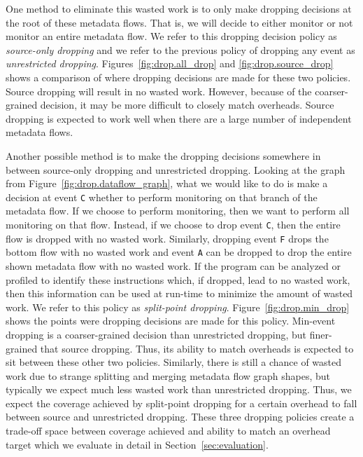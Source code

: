 One method to eliminate this wasted work is to only make dropping decisions at
the root of these metadata flows. That is, we will decide to either monitor or
not monitor an entire metadata flow. We refer to this dropping decision policy
as \emph{source-only dropping} and we refer to the previous policy of 
dropping any event as \emph{unrestricted dropping}.
Figures~\ref{fig:drop.all_drop} and \ref{fig:drop.source_drop} shows a
comparison of where dropping decisions are made for these two policies. Source
dropping will
result in no wasted work. However, because of the coarser-grained decision, it
may be more difficult to closely match overheads. Source dropping is expected
to work well when there are a large number of independent metadata flows.

Another possible method is to make the dropping decisions somewhere in between
source-only dropping and unrestricted dropping. Looking at the graph from 
Figure~\ref{fig:drop.dataflow_graph}, what we would like to do is make a
decision at event {\tt C} whether to perform monitoring on that branch of the
metadata flow. If we choose to perform monitoring, then we want to perform all
monitoring on that flow. Instead, if we choose to drop event {\tt C}, then the
entire flow is dropped with no wasted work. Similarly, dropping event {\tt F}
drops the bottom flow with no wasted work and event {\tt A} can be dropped to
drop the entire shown metadata flow with no wasted work. If the program can be
analyzed or profiled to identify these instructions which, if dropped, lead to
no wasted work, then this information can be used at run-time to minimize the
amount of wasted work. We refer to this policy as \emph{split-point dropping}.
Figure~\ref{fig:drop.min_drop} shows the points were dropping decisions are
made for this policy.
Min-event dropping is a coarser-grained decision than unrestricted dropping, but
finer-grained that source dropping. Thus, its ability to match overheads is
expected to sit between these other two policies. Similarly, there is still a
chance of wasted work due to strange splitting and merging metadata flow graph
shapes, but typically we expect much less wasted work than unrestricted 
dropping. Thus, we expect the coverage achieved by split-point dropping for a
certain overhead to fall between source and unrestricted dropping. These three
dropping policies create a trade-off space between coverage achieved and
ability to match an overhead target which we evaluate in detail in
Section~\ref{sec:evaluation}.


